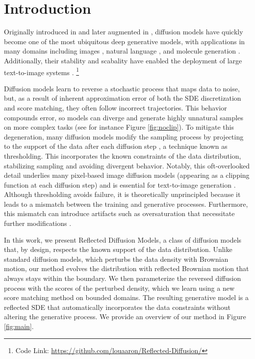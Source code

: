 \documentclass{article}
\theoremstyle{plain}
\theoremstyle{definition}
\theoremstyle{remark}
\newcommand\blfootnote[1]{\begingroup
  \renewcommand\thefootnote{}\footnote{#1}\addtocounter{footnote}{-1}\endgroup
}
\begin{document}
\section{Introduction}

Originally introduced in \citet{SohlDickstein2015DeepUL} and later augmented in \citet{song2019generative,Ho2020DenoisingDP, Song2020ScoreBasedGM}, diffusion models have quickly become one of the most ubiquitous deep generative models, with applications in many domains including images \citep{Dhariwal2021DiffusionMB}, natural language \citep{Li2022DiffusionLMIC}, and molecule generation \citep{Xu2022GeoDiffAG}. Additionally, their stability and scabality have enabled the deployment of large text-to-image systems \citep{Ramesh2022HierarchicalTI}.\blfootnote{Code Link: \href{https://github.com/louaaron/Reflected-Diffusion/}{https://github.com/louaaron/Reflected-Diffusion/}}


Diffusion models learn to reverse a stochastic process that maps data to noise, but, as a result of inherent approximation error of both the SDE discretization and score matching, they often follow incorrect trajectories. This behavior compounds error, so models can diverge and generate highly unnatural samples on more complex tasks (see for instance Figure \ref{fig:noclip}). To mitigate this degeneration, many diffusion models modify the sampling process by projecting to the support of the data after each diffusion step \citep{Ho2020DenoisingDP, Li2022DiffusionLMIC}, a technique known as thresholding. This incorporates the known constraints of the data distribution, stabilizing sampling and avoiding divergent behavior. Notably, this oft-overlooked detail underlies many pixel-based image diffusion models \citep{Ho2020DenoisingDP, Dhariwal2021DiffusionMB} (appearing as a  clipping function at each diffusion step) and is essential for text-to-image generation \citep{Saharia2022PhotorealisticTD}. Although thresholding avoids failure, it is theoretically unprincipled because it leads to a mismatch between the training and generative processes. Furthermore, this mismatch can introduce artifacts such as oversaturation \citep{Ho2022ClassifierFreeDG} that necessitate further modifications \citep{Saharia2022PhotorealisticTD}.

In this work, we present Reflected Diffusion Models, a class of diffusion models that, by design, respects the known support of the data distribution. Unlike standard diffusion models, which perturbs the data density with Brownian motion, our method evolves the distribution with reflected Brownian motion that always stays within the boundary. We then parameterize the reversed diffusion process with the scores of the perturbed density, which we learn using a new score matching method on bounded domains. The resulting generative model is a reflected SDE that automatically incorporates the data constraints without altering the generative process. We provide an overview of our method in Figure \ref{fig:main}.
\end{document}
